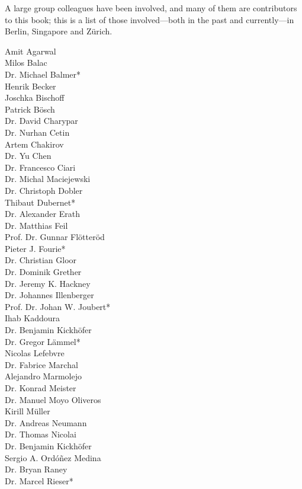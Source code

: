 A large group colleagues have been involved, and many of them are contributors to this book; this is a list of those involved---both in the past and currently---in Berlin, Singapore and Zürich.  
%
\begin{multicols}{3}
Amit Agarwal \\
Milos Balac  \\
Dr. Michael Balmer\mbox{*} \\
Henrik Becker \\
Joschka Bischoff \\
Patrick Bösch \\
Dr. David Charypar \\
Dr. Nurhan Cetin  \\
Artem Chakirov \\
Dr. Yu Chen \\
Dr. Francesco Ciari \\
Dr. Michal Maciejewski \\
Dr. Christoph Dobler \\
Thibaut Dubernet\mbox{*} \\
Dr. Alexander Erath \\
Dr. Matthias Feil \\
Prof. Dr. Gunnar Flötteröd \\
Pieter J. Fourie\mbox{*} \\
Dr. Christian Gloor \\
Dr. Dominik Grether \\
Dr. Jeremy K. Hackney \\
Dr. Johannes Illenberger \\
Prof. Dr. Johan W. Joubert\mbox{*} \\
Ihab Kaddoura \\
Dr. Benjamin Kickhöfer \\
Dr. Gregor Lämmel\mbox{*} \\
Nicolas Lefebvre \\
Dr. Fabrice Marchal \\
Alejandro Marmolejo \\
Dr. Konrad Meister \\
Dr. Manuel Moyo Oliveros \\
Kirill Müller \\
Dr. Andreas Neumann \\
Dr. Thomas Nicolai \\
Dr. Benjamin Kickhöfer \\
Sergio A. Ordóñez Medina \\
Dr. Bryan Raney \\
Dr. Marcel Rieser\mbox{*} \\

\end{multicols}
